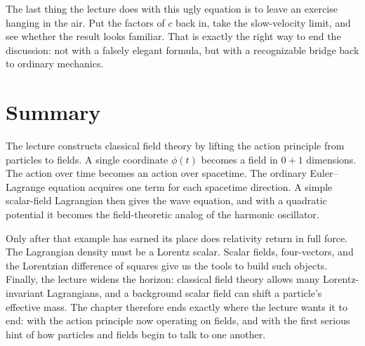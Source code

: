The last thing the lecture does with this ugly equation is to leave an exercise hanging in the air. Put the factors of \(c\) back in, take the slow-velocity limit, and see whether the result looks familiar. That is exactly the right way to end the discussion: not with a falsely elegant formula, but with a recognizable bridge back to ordinary mechanics.

\section{Summary}

The lecture constructs classical field theory by lifting the action principle from particles to fields. A single coordinate \(\phi(t)\) becomes a field in \(0+1\) dimensions. The action over time becomes an action over spacetime. The ordinary Euler--Lagrange equation acquires one term for each spacetime direction. A simple scalar-field Lagrangian then gives the wave equation, and with a quadratic potential it becomes the field-theoretic analog of the harmonic oscillator.

Only after that example has earned its place does relativity return in full force. The Lagrangian density must be a Lorentz scalar. Scalar fields, four-vectors, and the Lorentzian difference of squares give us the tools to build such objects. Finally, the lecture widens the horizon: classical field theory allows many Lorentz-invariant Lagrangians, and a background scalar field can shift a particle's effective mass. The chapter therefore ends exactly where the lecture wants it to end: with the action principle now operating on fields, and with the first serious hint of how particles and fields begin to talk to one another.
